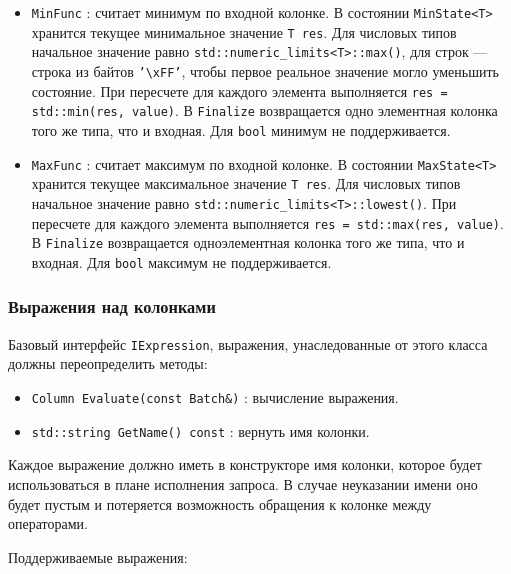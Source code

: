 \documentclass[a4paper,12pt]{extarticle}
\begin{document}
\begin{itemize}
    \item \texttt{MinFunc} : считает минимум по входной колонке. В состоянии
    \texttt{MinState<T>} хранится текущее минимальное значение \texttt{T res}. Для
    числовых типов начальное значение равно \texttt{std::numeric\_limits<T>::max()},
    для строк --- строка из байтов \texttt{'\textbackslash xFF'}, чтобы первое реальное
    значение могло уменьшить состояние. При пересчете для каждого элемента выполняется
    \texttt{res = std::min(res, value)}. В \texttt{Finalize} возвращается одно элементная
    колонка того же типа, что и входная. Для \texttt{bool} минимум не поддерживается.

    \item \texttt{MaxFunc} : считает максимум по входной колонке. В состоянии
    \texttt{MaxState<T>} хранится текущее максимальное значение \texttt{T res}. Для
    числовых типов начальное значение равно \texttt{std::numeric\_limits<T>::lowest()}.
    При пересчете для каждого элемента выполняется \texttt{res = std::max(res, value)}.
    В \texttt{Finalize} возвращается одноэлементная колонка того же типа, что и входная.
    Для \texttt{bool} максимум не поддерживается.
\end{itemize}

\subsubsection{Выражения над колонками}

Базовый интерфейс \texttt{IExpression}, выражения, унаследованные от этого класса
должны переопределить методы:

\begin{itemize}
    \item \texttt{Column Evaluate(const Batch\&)} : вычисление выражения.
    \item \texttt{std::string GetName() const} : вернуть имя колонки.
\end{itemize}

Каждое выражение должно иметь в конструкторе имя колонки,
которое будет использоваться в плане исполнения запроса. В случае
неуказании имени оно будет пустым и потеряется возможность обращения к колонке
между операторами.


Поддерживаемые выражения:
\end{document}
